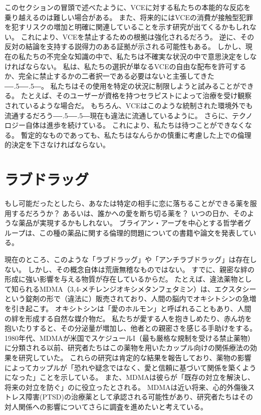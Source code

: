 \documentclass[paper=a4,book,openany]{jlreq}
\def\DDASH{―\kern-.5\zw―\kern-.5\zw―}
\begin{document}
このセクションの冒頭で述べたように、VCEに対する私たちの本能的な反応を乗り越えるのは難しい場合がある。
また、将来的にはVCEの消費が接触型犯罪を犯すリスクの増加と明確に関連していることを示す研究が出てくるかもしれない。
これにより、VCEを禁止するための根拠は強化されるだろう。
逆に、その反対の結論を支持する説得力のある証拠が示される可能性もある。
しかし、現在の私たちの不完全な知識の中で、私たちは不確実な状況の中で意思決定をしなければならない。
私は、私たちの選択が単なるVCEの自由な配布を許可するか、完全に禁止するかの二者択一である必要はないと主張してきた{\DDASH}。
私たちはその使用を特定の状況に制限しようと試みることができる。
たとえば、そのユーザーが資格を持つセラピストによって治療を受け観察されているような場合だ。
もちろん、VCEはこのような統制された環境外でも流通するだろう{\DDASH}現在も違法に流通しているように。
さらに、テクノロジー自体は進歩を続けている。
これにより、私たちは待つことができなくなる。
暫定的なものであっても、私たちはなんらかの慎重に考慮した上での倫理的決定を下さなければならない。

\section{ラブドラッグ}

もし可能だったとしたら、あなたは特定の相手に恋に落ちることができる薬を服用するだろうか？ あるいは、誰かへの愛を断ち切る薬を？ いつの日か、そのような薬品が実現するかもしれない。
ブライアン・アープを中心とする哲学者グループは、この種の薬品に関する倫理的問題についての書籍や論文を発表している。

現在のところ、このような「ラブドラッグ」や「アンチラブドラッグ」は存在しない。
しかし、その概念自体は荒唐無稽なものではない。
すでに、親密な絆の形成に強い影響を与える物質が存在しているからだ。
たとえば、違法薬物として知られるMDMA（3,4-メチレンジオキシメタンフェタミン）は、エクスタシーという錠剤の形で（違法に）販売されており、人間の脳内でオキシトシンの急増を引き起こす。
オキシトシンは「愛のホルモン」と呼ばれることもあり、人間の絆を形成する自然な媒介物だ。
私たちが愛する人を抱きしめたり、赤ん坊を抱いたりすると、その分泌量が増加し、他者との親密さを感じる手助けをする。
1980年代、MDMAが米国でスケジュールI（最も厳格な規制を受ける禁止薬物）に分類される以前、研究者たちはこの薬物を用いたカップル向けの関係療法の効果を研究していた。
これらの研究は肯定的な結果を報告しており、薬物の影響によってカップルが「恐れや疑念ではなく、愛と信頼に基づいて関係を築くようになった」ことを示している。
また、MDMAは彼らが「既存の対立を解決し、将来の対立を防ぐ」のに役立ったとされる\citep[p.378]{greer98:_method_conduc_therap_session_mdma}。
MDMAは近い将来、心的外傷後ストレス障害(PTSD)の治療薬として承認される可能性があり、研究者たちはその対人関係への影響についてさらに調査を進めたいと考えている。
\end{document}
